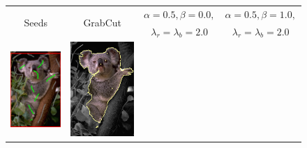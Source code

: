 \begin{figure}
\center
\begin{tabular}{cccc}
\multirow{2}{*}{Seeds} & \multirow{2}{*}{GrabCut} & $\alpha=0.5, \beta=0.0,$ & $\alpha=0.5, \beta=1.0,$\\
& & $\lambda_r=\lambda_b=2.0$ & $\lambda_r=\lambda_b=2.0$\\
 	\includegraphics[scale=0.25]{figures/chapter8/segmentation/coala/k-0.0/seeds.png} & 
 	\includegraphics[scale=0.25]{figures/chapter8/segmentation/coala/k-0.0/gc-seg.png} &  	

\end{tabular}
\end{figure}

